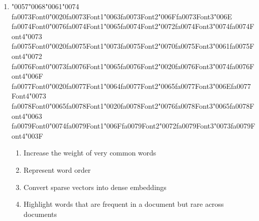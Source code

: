 \documentclass[12pt]{article}
\begin{document}
\begin{enumerate}[label=Q\arabic*.]
\item {\char"0057}{\char"0068}{\char"0061}{\char"0074} {\csname fa0073Font0\endcsname\char"0020}{\csname fa0073Font1\endcsname\char"0063}{\csname fa0073Font2\endcsname\char"006F}{\csname fa0073Font3\endcsname\char"006E} {\csname fa0074Font0\endcsname\char"0076}{\csname fa0074Font1\endcsname\char"0065}{\csname fa0074Font2\endcsname\char"0072}{\csname fa0074Font3\endcsname\char"0074}{\csname fa0074Font4\endcsname\char"0073} {\csname fa0075Font0\endcsname\char"0020}{\csname fa0075Font1\endcsname\char"0073}{\csname fa0075Font2\endcsname\char"0070}{\csname fa0075Font3\endcsname\char"0061}{\csname fa0075Font4\endcsname\char"0072} {\csname fa0076Font0\endcsname\char"0073}{\csname fa0076Font1\endcsname\char"0065}{\csname fa0076Font2\endcsname\char"0020}{\csname fa0076Font3\endcsname\char"0074}{\csname fa0076Font4\endcsname\char"006F} {\csname fa0077Font0\endcsname\char"0020}{\csname fa0077Font1\endcsname\char"0064}{\csname fa0077Font2\endcsname\char"0065}{\csname fa0077Font3\endcsname\char"006E}{\csname fa0077Font4\endcsname\char"0073} {\csname fa0078Font0\endcsname\char"0065}{\csname fa0078Font1\endcsname\char"0020}{\csname fa0078Font2\endcsname\char"0076}{\csname fa0078Font3\endcsname\char"0065}{\csname fa0078Font4\endcsname\char"0063} {\csname fa0079Font0\endcsname\char"0074}{\csname fa0079Font1\endcsname\char"006F}{\csname fa0079Font2\endcsname\char"0072}{\csname fa0079Font3\endcsname\char"0073}{\csname fa0079Font4\endcsname\char"003F}
\begin{enumerate}[label=(\Alph*)]
    \item Increase the weight of very common words
    \item Represent word order
    \item Convert sparse vectors into dense embeddings
    \item Highlight words that are frequent in a document but rare across documents
\end{enumerate}
\newpage %

\end{enumerate}
\end{document}
